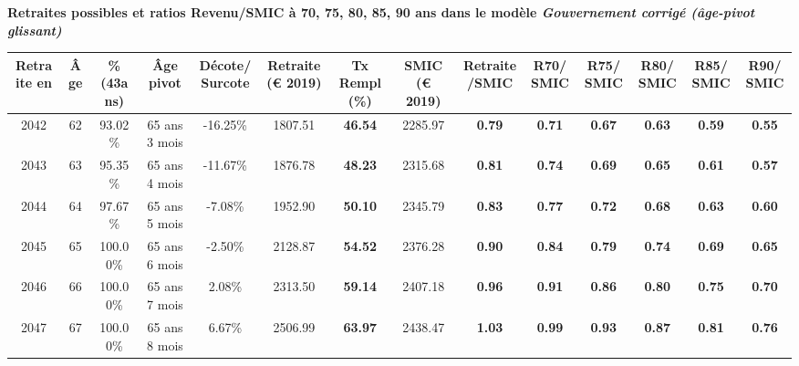  \vspace{0.1cm} 
{\bf \noindent Retraites possibles et ratios Revenu/SMIC à 70, 75, 80, 85, 90 ans dans le modèle \emph{Gouvernement corrigé (âge-pivot glissant)}}  
 
\begin{adjustbox}{max width=\textwidth} 
\begin{tabular}[htb]{|c|c||c|c|c||c|c||c|c||c|c|c|c|c|} 
\hline 
 Retraite en &  Âge &  \%(43ans) &  Âge pivot &  Décote/Surcote &  Retraite (\euro{} 2019) &  Tx Rempl(\%) &  SMIC (\euro{} 2019) &  Retraite/SMIC &  R70/SMIC &  R75/SMIC &  R80/SMIC &  R85/SMIC &  R90/SMIC \\ 
\hline \hline 
 2042 &  62 &  93.02\% &  65 ans 3 mois &  -16.25\% &  1807.51 &  {\bf 46.54} &  2285.97 &  {\bf {\color{red} 0.79}} &  {\bf {\color{red} 0.71}} &  {\bf {\color{red} 0.67}} &  {\bf {\color{red} 0.63}} &  {\bf {\color{red} 0.59}} &  {\bf {\color{red} 0.55}} \\ 
\hline 
 2043 &  63 &  95.35\% &  65 ans 4 mois &  -11.67\% &  1876.78 &  {\bf 48.23} &  2315.68 &  {\bf {\color{red} 0.81}} &  {\bf {\color{red} 0.74}} &  {\bf {\color{red} 0.69}} &  {\bf {\color{red} 0.65}} &  {\bf {\color{red} 0.61}} &  {\bf {\color{red} 0.57}} \\ 
\hline 
 2044 &  64 &  97.67\% &  65 ans 5 mois &  -7.08\% &  1952.90 &  {\bf 50.10} &  2345.79 &  {\bf {\color{red} 0.83}} &  {\bf {\color{red} 0.77}} &  {\bf {\color{red} 0.72}} &  {\bf {\color{red} 0.68}} &  {\bf {\color{red} 0.63}} &  {\bf {\color{red} 0.60}} \\ 
\hline 
 2045 &  65 &  100.00\% &  65 ans 6 mois &  -2.50\% &  2128.87 &  {\bf 54.52} &  2376.28 &  {\bf {\color{red} 0.90}} &  {\bf {\color{red} 0.84}} &  {\bf {\color{red} 0.79}} &  {\bf {\color{red} 0.74}} &  {\bf {\color{red} 0.69}} &  {\bf {\color{red} 0.65}} \\ 
\hline 
 2046 &  66 &  100.00\% &  65 ans 7 mois &  2.08\% &  2313.50 &  {\bf 59.14} &  2407.18 &  {\bf {\color{red} 0.96}} &  {\bf {\color{red} 0.91}} &  {\bf {\color{red} 0.86}} &  {\bf {\color{red} 0.80}} &  {\bf {\color{red} 0.75}} &  {\bf {\color{red} 0.70}} \\ 
\hline 
 2047 &  67 &  100.00\% &  65 ans 8 mois &  6.67\% &  2506.99 &  {\bf 63.97} &  2438.47 &  {\bf 1.03} &  {\bf {\color{red} 0.99}} &  {\bf {\color{red} 0.93}} &  {\bf {\color{red} 0.87}} &  {\bf {\color{red} 0.81}} &  {\bf {\color{red} 0.76}} \\ 
\hline 
\hline 
\end{tabular} 
\end{adjustbox} 
 
